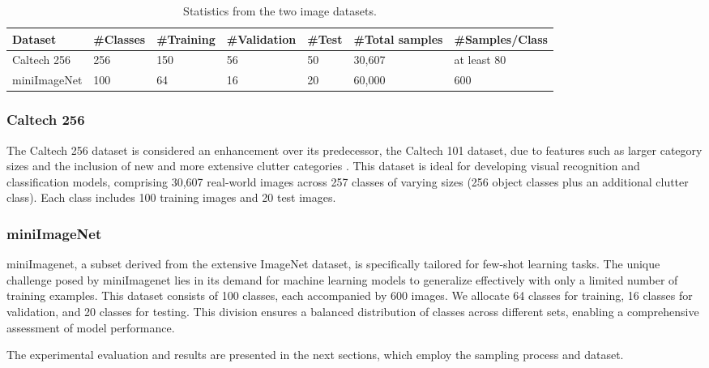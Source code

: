 \begin{table}[!ht]
    \centering
    \caption{Statistics from the two image datasets.}
    \begin{adjustbox}{width=0.9\linewidth}
    \renewcommand{\arraystretch}{1.5} 
    \begin{tabular}{|l|l|l|l|l|l|l|}
    \hline
        \textbf{Dataset} & \textbf{\#Classes} & \textbf{\#Training} & \textbf{\#Validation} & \textbf{\#Test} & \textbf{\#Total samples} & 
        \textbf{\#Samples/Class} \\ \hline
        Caltech 256 & 256 & 150 & 56 & 50 & 30,607 & at least 80 \\ \hline
        miniImageNet & 100 & 64 & 16 & 20 & 60,000 & 600 \\ \hline
    \end{tabular}
    \end{adjustbox}
\label{table:data}
\end{table}

\subsubsection{Caltech 256} The Caltech 256 dataset is considered an enhancement over its predecessor, the Caltech 101 dataset, due to features such as larger category sizes and the inclusion of new and more extensive clutter categories \cite{li_andreeto_ranzato_perona_2022}. This dataset is ideal for developing visual recognition and classification models, comprising 30,607 real-world images across 257 classes of varying sizes (256 object classes plus an additional clutter class). Each class includes 100 training images and 20 test images.

\subsubsection{miniImageNet} miniImagenet, a subset derived from the extensive ImageNet dataset, is specifically tailored for few-shot learning tasks. The unique challenge posed by miniImagenet lies in its demand for machine learning models to generalize effectively with only a limited number of training examples. This dataset consists of 100 classes, each accompanied by 600 images. We allocate 64 classes for training, 16 classes for validation, and 20 classes for testing. This division ensures a balanced distribution of classes across different sets, enabling a comprehensive assessment of model performance.

The experimental evaluation and results are presented in the next sections, which employ the sampling process and dataset.

